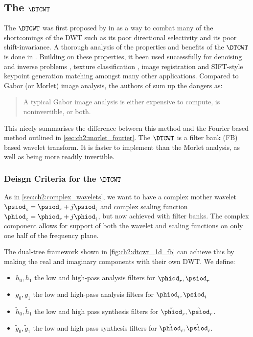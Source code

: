 \subsection{The $\DTCWT$}
  The $\DTCWT$ was first proposed by \citeauthor{kingsbury_dual-tree_1998} in
  \cite{kingsbury_dual-tree_1998, kingsbury_dual-tree_1998-1} as a way to combat
  many of the shortcomings of the DWT such as its poor directional
  selectivity and its poor shift-invariance. A thorough analysis of the
  properties and benefits of the $\DTCWT$ is done in
  \cite{kingsbury_image_1999,selesnick_dual-tree_2005}. Building on these
  properties, it been used
  successfully for denoising and inverse problems \cite{rivaz_bayesian_2001,
  zhang_bayesian_2008, zhang_variational_2015, miller_image_2008}, texture
  classification \cite{hatipoglu_texture_1999, rivaz_complex_1999}, image
  registration \cite{loo_motion-estimation-based_2001, chen_efficient_2012}
  and SIFT-style keypoint generation matching \cite{fauqueur_multiscale_2006,
  anderson_determining_2005, anderson_rotation-invariant_2006,
  bendale_multiscale_2010, ng_robust_2012} amongst many other applications.
  Compared to Gabor (or Morlet) image analysis, the authors of
  \cite{selesnick_dual-tree_2005} sum up the dangers as:
  \begin{quote}
    A typical Gabor image analysis is either expensive to compute, is
    noninvertible, or both.
  \end{quote}
  This nicely summarises the difference between this method and the Fourier
  based method outlined in \autoref{sec:ch2:morlet_fourier}. The $\DTCWT$ is
  a filter bank (FB) based wavelet transform. It is faster
  to implement than the Morlet analysis, as well as being more readily invertible.

\subsubsection{Deisgn Criteria for the $\DTCWT$}
  As in \autoref{sec:ch2:complex_wavelets}, we want to have a complex mother
  wavelet $\psiod_c = \psiod_r + j\psiod_i$ and complex scaling function $\phiod_c =
  \phiod_r + j\phiod_i$, but now achieved with filter banks. The complex component
  allows for support of both the wavelet and scaling functions on only one half of
  the frequency plane.

  The dual-tree framework shown in \autoref{fig:ch2:dtcwt_1d_fb} can achieve this
  by making the real and imaginary components with their own DWT.
  We define:
  \begin{itemize}
    \item $h_0, h_1$ the low and high-pass analysis filters for $\phiod_r, \psiod_r$
    \item $g_0, g_1$ the low and high-pass analysis filters for $\phiod_i, \psiod_i$
    \item $\tilde{h}_0, \tilde{h}_1$ the low and high pass synthesis filters
      for $\tilde{\phiod}_r, \tilde{\psiod}_r$.
    \item $\tilde{g}_0, \tilde{g}_1$ the low and high pass synthesis filters for
      $\tilde{\phiod}_i, \tilde{\psiod}_i$.
  \end{itemize}

